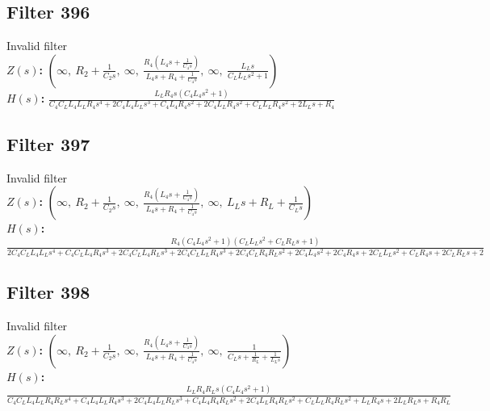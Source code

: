 \documentclass{article}
\begin{document}
\subsection*{Filter 396}
Invalid filter \\ 
\textbf{$Z(s)$:} $\left( \infty, \  R_{2} + \frac{1}{C_{2} s}, \  \infty, \  \frac{R_{4} \left(L_{4} s + \frac{1}{C_{4} s}\right)}{L_{4} s + R_{4} + \frac{1}{C_{4} s}}, \  \infty, \  \frac{L_{L} s}{C_{L} L_{L} s^{2} + 1}\right)$ \\ 
\textbf{$H(s)$:} $\frac{L_{L} R_{4} s \left(C_{4} L_{4} s^{2} + 1\right)}{C_{4} C_{L} L_{4} L_{L} R_{4} s^{4} + 2 C_{4} L_{4} L_{L} s^{3} + C_{4} L_{4} R_{4} s^{2} + 2 C_{4} L_{L} R_{4} s^{2} + C_{L} L_{L} R_{4} s^{2} + 2 L_{L} s + R_{4}}$ \\ 
\subsection*{Filter 397}
Invalid filter \\ 
\textbf{$Z(s)$:} $\left( \infty, \  R_{2} + \frac{1}{C_{2} s}, \  \infty, \  \frac{R_{4} \left(L_{4} s + \frac{1}{C_{4} s}\right)}{L_{4} s + R_{4} + \frac{1}{C_{4} s}}, \  \infty, \  L_{L} s + R_{L} + \frac{1}{C_{L} s}\right)$ \\ 
\textbf{$H(s)$:} $\frac{R_{4} \left(C_{4} L_{4} s^{2} + 1\right) \left(C_{L} L_{L} s^{2} + C_{L} R_{L} s + 1\right)}{2 C_{4} C_{L} L_{4} L_{L} s^{4} + C_{4} C_{L} L_{4} R_{4} s^{3} + 2 C_{4} C_{L} L_{4} R_{L} s^{3} + 2 C_{4} C_{L} L_{L} R_{4} s^{3} + 2 C_{4} C_{L} R_{4} R_{L} s^{2} + 2 C_{4} L_{4} s^{2} + 2 C_{4} R_{4} s + 2 C_{L} L_{L} s^{2} + C_{L} R_{4} s + 2 C_{L} R_{L} s + 2}$ \\ 
\subsection*{Filter 398}
Invalid filter \\ 
\textbf{$Z(s)$:} $\left( \infty, \  R_{2} + \frac{1}{C_{2} s}, \  \infty, \  \frac{R_{4} \left(L_{4} s + \frac{1}{C_{4} s}\right)}{L_{4} s + R_{4} + \frac{1}{C_{4} s}}, \  \infty, \  \frac{1}{C_{L} s + \frac{1}{R_{L}} + \frac{1}{L_{L} s}}\right)$ \\ 
\textbf{$H(s)$:} $\frac{L_{L} R_{4} R_{L} s \left(C_{4} L_{4} s^{2} + 1\right)}{C_{4} C_{L} L_{4} L_{L} R_{4} R_{L} s^{4} + C_{4} L_{4} L_{L} R_{4} s^{3} + 2 C_{4} L_{4} L_{L} R_{L} s^{3} + C_{4} L_{4} R_{4} R_{L} s^{2} + 2 C_{4} L_{L} R_{4} R_{L} s^{2} + C_{L} L_{L} R_{4} R_{L} s^{2} + L_{L} R_{4} s + 2 L_{L} R_{L} s + R_{4} R_{L}}$ \\ 
\end{document}
